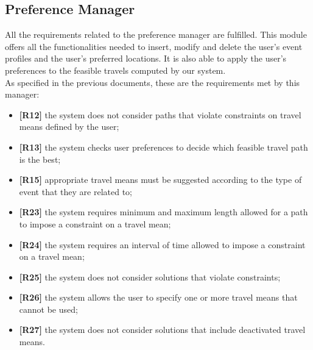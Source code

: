\subsection{Preference Manager}
All the requirements related to the preference manager are fulfilled.
This module offers all the functionalities needed to insert, modify and delete the user's event profiles and the user's preferred locations. It is also able to apply the user's preferences to the feasible travels computed by our system. \\
As specified in the previous documents, these are the requirements met by this manager:
\begin{itemize}
	\item \textbf{[R12]} the system does not consider paths that violate constraints on travel means defined by the user;
	\item \textbf{[R13]} the system checks user preferences to decide which feasible travel path is the best;
	\item \textbf{[R15]} appropriate travel means must be suggested according to the type of event that they are related to;
	\item  \textbf{[R23]} the system requires minimum and maximum length allowed for a path to impose a constraint on a travel mean;
	\item \textbf{[R24]} the system requires an interval of time allowed to impose a constraint on a travel mean;
	\item \textbf{[R25]} the system does not consider solutions that violate constraints;
	\item \textbf{[R26]} the system allows the user to specify one or more travel means that cannot be used;
	\item \textbf{[R27]} the system does not consider solutions that include deactivated travel means.
\end{itemize}

